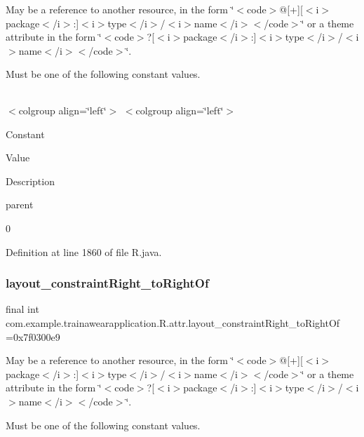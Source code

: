 May be a reference to another resource, in the form \char`\"{}$<$code$>$@\mbox{[}+\mbox{]}\mbox{[}$<$i$>$package$<$/i$>$\+:\mbox{]}$<$i$>$type$<$/i$>$/$<$i$>$name$<$/i$>$$<$/code$>$\char`\"{} or a theme attribute in the form \char`\"{}$<$code$>$?\mbox{[}$<$i$>$package$<$/i$>$\+:\mbox{]}$<$i$>$type$<$/i$>$/$<$i$>$name$<$/i$>$$<$/code$>$\char`\"{}. 

Must be one of the following constant values.

\tabulinesep=1mm
\begin{longtabu}spread 0pt [c]{*{0}{|X[-1]}|}
\hline
\end{longtabu}
$<$colgroup align=\char`\"{}left\char`\"{}$>$ $<$colgroup align=\char`\"{}left\char`\"{}$>$ 

Constant

Value

Description 

parent

0

Definition at line 1860 of file R.\+java.

\mbox{\label{classcom_1_1example_1_1trainawearapplication_1_1_r_1_1attr_a22e180345beda1b0345b8ca0dd47d02e}} 
\subsubsection{\texorpdfstring{layout\_constraintRight\_toRightOf}{layout\_constraintRight\_toRightOf}}
{\footnotesize\ttfamily final int com.\+example.\+trainawearapplication.\+R.\+attr.\+layout\+\_\+constraint\+Right\+\_\+to\+Right\+Of =0x7f0300e9\hspace{0.3cm}{\ttfamily [static]}}

May be a reference to another resource, in the form \char`\"{}$<$code$>$@\mbox{[}+\mbox{]}\mbox{[}$<$i$>$package$<$/i$>$\+:\mbox{]}$<$i$>$type$<$/i$>$/$<$i$>$name$<$/i$>$$<$/code$>$\char`\"{} or a theme attribute in the form \char`\"{}$<$code$>$?\mbox{[}$<$i$>$package$<$/i$>$\+:\mbox{]}$<$i$>$type$<$/i$>$/$<$i$>$name$<$/i$>$$<$/code$>$\char`\"{}. 

Must be one of the following constant values.


